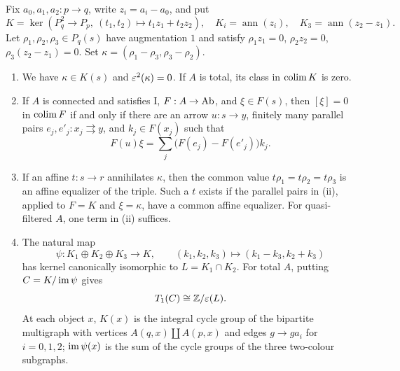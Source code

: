 \begin{theorem}\label{B:lead5}
Fix $a_0,a_1,a_2:p\to q$, write $z_i=a_i-a_0$, and put
\[
 K=\ker(P_q^2\to P_p,\ (t_1,t_2)\mapsto t_1z_1+t_2z_2),
 \quad K_i=\operatorname{ann}(z_i),\quad
 K_3=\operatorname{ann}(z_2-z_1).
\]
Let $\rho_1,\rho_2,\rho_3\in P_q(s)$ have augmentation $1$ and satisfy
$\rho_1z_1=0$, $\rho_2z_2=0$, $\rho_3(z_2-z_1)=0$. Set
$\kappa=(\rho_1-\rho_3,\rho_3-\rho_2)$.
\begin{enumerate}[label=(\roman*)]
\item We have $\kappa\in K(s)$ and $\varepsilon^2(\kappa)=0$. If $A$ is total, its class in $\operatorname*{colim} K$ is zero.
\item If $A$ is connected and satisfies I, $F:A\to\mathrm{Ab}$, and $\xi\in F(s)$, then $[\xi]=0$ in $\operatorname*{colim} F$ if and only if there are an arrow $u:s\to y$, finitely many parallel pairs $e_j,e'_j:x_j\rightrightarrows y$, and $k_j\in F(x_j)$ such that
\[
 F(u)\xi=\sum_j\bigl(F(e_j)-F(e'_j)\bigr)k_j.
\]
\item If an affine $t:s\to r$ annihilates $\kappa$, then the common value $t\rho_1=t\rho_2=t\rho_3$ is an affine equalizer of the triple. Such a $t$ exists if the parallel pairs in (ii), applied to $F=K$ and $\xi=\kappa$, have a common affine equalizer. For quasi-filtered $A$, one term in (ii) suffices.
\item The natural map
\[
 \psi:K_1\oplus K_2\oplus K_3\longrightarrow K,
 \qquad(k_1,k_2,k_3)\longmapsto(k_1-k_3,k_2+k_3)
\]
has kernel canonically isomorphic to $L=K_1\cap K_2$. For total $A$, putting $C=K/\operatorname{im}\psi$ gives
\[
 T_1(C)\cong\mathbb Z/\varepsilon(L).
\]
At each object $x$, $K(x)$ is the integral cycle group of the bipartite multigraph with vertices $A(q,x)\amalg A(p,x)$ and edges $g\to ga_i$ for $i=0,1,2$; $\operatorname{im}\psi(x)$ is the sum of the cycle groups of the three two-colour subgraphs.
\end{enumerate}
\end{theorem}
